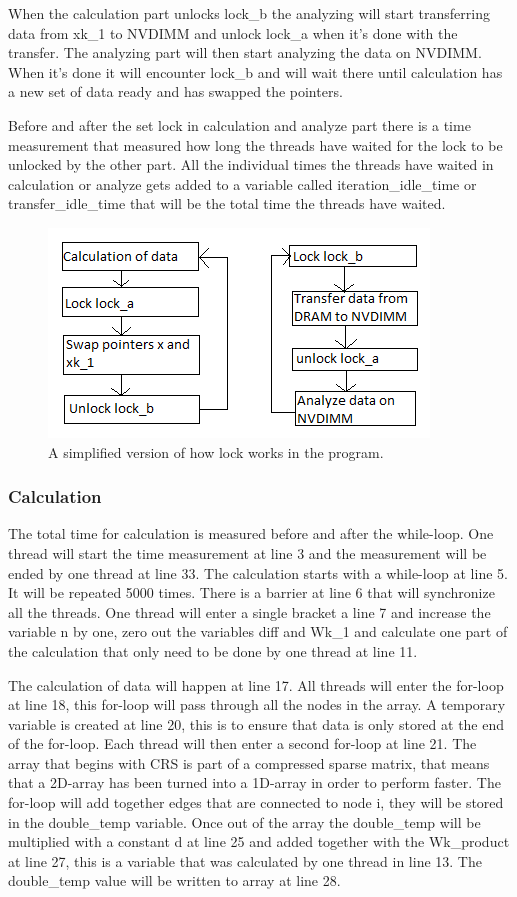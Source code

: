 \documentclass[12pt,a4paper,USenglish]{article}      %
\begin{document}
When the calculation part unlocks lock\_b the analyzing will start transferring data from xk\_1 to NVDIMM and unlock lock\_a when it's done with the transfer. The analyzing part will then start analyzing the data on NVDIMM. When it's done it will encounter lock\_b and will wait there until calculation has a new set of data ready and has swapped the pointers.

Before and after the set lock in calculation and analyze part there is a time measurement that measured how long the threads have waited for the lock to be unlocked by the other part. All the individual times the threads have waited in calculation or analyze gets added to a variable called iteration\_idle\_time or transfer\_idle\_time that will be the total time the threads have waited. 

\begin{figure}[!hbtp]
\includegraphics[scale=1]{lock_overview.png}
\caption{A simplified version of how lock works in the program.}
\end{figure}

\subsubsection{Calculation}
The total time for calculation is measured before and after the while-loop. One thread will start the time measurement at line 3 and the measurement will be ended by one thread at line 33.
The calculation starts with a while-loop at line 5. It will be repeated 5000 times. There is a barrier at line 6 that will synchronize all the threads. One thread will enter a single bracket a line 7 and increase the variable n by one, zero out the variables diff and Wk\_1 and calculate one part of the calculation that only need to be done by one thread at line 11.

The calculation of data will happen at line 17. All threads will enter the for-loop at line 18, this for-loop will pass through all the nodes in the array. A temporary variable is created at line 20, this is to ensure that data is only stored at the end of the for-loop. Each thread will then enter a second for-loop at line 21. The array that begins with CRS is part of a compressed sparse matrix, that means that a 2D-array has been turned into a 1D-array in order to perform faster. The for-loop will add together edges that are connected to node i, they will be stored in the double\_temp variable. Once out of the array the double\_temp will be multiplied with a constant d at line 25 and added together with the Wk\_product at line 27, this is a variable that was calculated by one thread in line 13.
The double\_temp value will be written to array at line 28.
\end{document}
